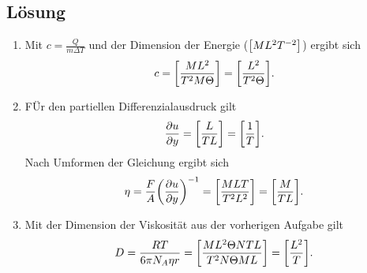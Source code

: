 \documentclass[german,12pt]{homework}
\DeclarePairedDelimiter{\enbrace}{(}{)}
\DeclarePairedDelimiter{\benbrace}{[}{]}
\begin{document}
    \subsection*{Lösung}
    \begin{enumerate}
        \item Mit \(c = \frac{Q}{m{\Delta}T}\) und der Dimension der Energie
        (\(\benbrace*{ML^2T^{-2}}\)) ergibt sich
        \[c = \benbrace*{\frac{ML^2}{T^2M\Theta}} =
        \benbrace*{\frac{L^2}{T^2\Theta}}.\]
        \item FÜr den partiellen Differenzialausdruck gilt
        \[\frac{\partial{u}}{\partial{y}} = \benbrace*{\frac{L}{TL}} =
        \benbrace*{\frac{1}{T}}.\]
        Nach Umformen der Gleichung ergibt sich
        \[\eta = \frac{F}{A}\enbrace*{\frac{\partial{u}}{\partial{y}}}^{-1}
        = \benbrace*{\frac{MLT}{T^2L^2}} = \benbrace*{\frac{M}{TL}}.\]
        \item Mit der Dimension der Viskosität aus der vorherigen Aufgabe gilt
        \[D = \frac{RT}{6\pi{N_A}\eta{r}} = \benbrace*{\frac{ML^2\Theta{N}TL}
        {T^2N\Theta{M}L}} = \benbrace*{\frac{L^2}{T}}.\]
    \end{enumerate}
\end{document}
